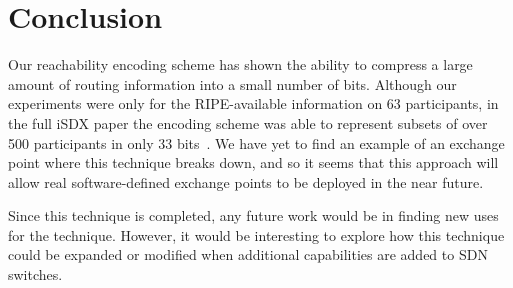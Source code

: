 \section{Conclusion} \label{sec:conclusion}

Our reachability encoding scheme has shown the ability to compress a large amount of routing information into a small number of bits. Although our experiments were only for the RIPE-available information on 63 participants, in the full iSDX paper the encoding scheme was able to represent subsets of over 500 participants in only 33 bits~\cite{isdx}. We have yet to find an example of an exchange point where this technique breaks down, and so it seems that this approach will allow real software-defined exchange points to be deployed in the near future. 

Since this technique is completed, any future work would be in finding new uses for the technique. However, it would be interesting to explore how this technique could be expanded or modified when additional capabilities are added to SDN switches.